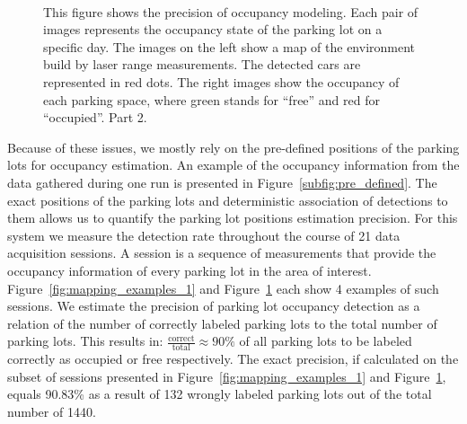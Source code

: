 \begin{figure}[p]
\hspace{2mm}
\\
\caption{This figure shows the precision of occupancy modeling. Each pair of images represents the occupancy state of the parking lot on a specific day. The images on the left show a map of the environment build by laser range measurements. The detected cars are represented in red dots. The right images show the occupancy of each parking space, where green stands for ``free'' and red for ``occupied''. Part 2.}
\label{fig:mapping_examples_2}
\end{figure}

Because of these issues, we mostly rely on the pre-defined positions of the
parking lots for occupancy estimation. An example of the occupancy information
from the data gathered during one run is presented in
Figure~\ref{subfig:pre_defined}. The exact positions of the parking lots and
deterministic association of detections to them allows us to quantify the
parking lot positions estimation precision. For this system we measure the
detection rate throughout the course of 21 data acquisition sessions. A
session is a sequence of measurements that provide the occupancy information
of every parking lot in the area of interest.
Figure~\ref{fig:mapping_examples_1} and Figure~\ref{fig:mapping_examples_2}
each show 4 examples of such sessions. We estimate the precision of parking
lot occupancy detection as a relation of the number of correctly labeled
parking lots to the total number of parking lots. This results in:
$\frac{\mathrm{correct}}{\mathrm{total}} \approx 90\% $ of all parking lots to
be labeled correctly as occupied or free respectively. The exact precision, if
calculated on the subset of sessions presented in
Figure~\ref{fig:mapping_examples_1} and Figure~\ref{fig:mapping_examples_2},
equals 90.83\% as a result of 132 wrongly labeled parking lots out of the
total number of 1440.

